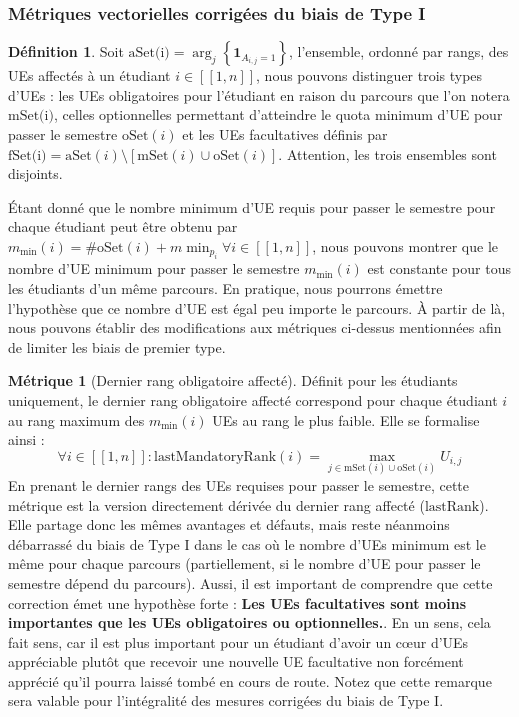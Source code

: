 \documentclass{rapport}
\theoremstyle{definition}
\newtheorem{definition}{Définition}
\theoremstyle{remark}
\theoremstyle{definition}
\newtheorem*{metric}{Métrique}
\theoremstyle{remark}
\newcommand{\llbracket}{[\![}
\newcommand{\rrbracket}{]\!]}
\begin{document}
\subsubsection{Métriques vectorielles corrigées du biais de Type I}

\begin{definition}
    Soit $\text{aSet(i)}=\arg_j\left\{\mathbf{1}_{A_{i,j}=1}\right\}$, l'ensemble, ordonné par rangs, des UEs affectés à un étudiant $i\in \llbracket 1,n\rrbracket$, nous pouvons distinguer trois types d'UEs :
    les UEs obligatoires pour l'étudiant en raison du parcours que l'on notera $\text{mSet(i)}$,
    celles optionnelles permettant d'atteindre le quota minimum d'UE pour passer le semestre $\text{oSet}(i)$
    et les UEs facultatives définis par $\text{fSet(i)} = \text{aSet}(i)\setminus[\text{mSet}(i)\cup\text{oSet}(i)]$.
    Attention, les trois ensembles sont disjoints.
\end{definition}
Étant donné que le nombre minimum d'UE requis pour passer le semestre pour chaque étudiant peut être obtenu par $m_{\min}(i)=\#\text{oSet}(i)+m\!\min_{p_i} \forall i \in \llbracket 1,n \rrbracket$,
nous pouvons montrer que le nombre d'UE minimum pour passer le semestre $m_{\min}(i)$ est constante pour tous les étudiants d'un même parcours. En pratique, nous pourrons émettre l'hypothèse que ce nombre d'UE
est égal peu importe le parcours. À partir de là, nous pouvons établir des modifications aux métriques ci-dessus mentionnées afin de limiter les biais de premier type.

\begin{metric}[Dernier rang obligatoire affecté]
    Définit pour les étudiants uniquement, le dernier rang obligatoire affecté correspond pour chaque étudiant $i$ au rang maximum des $m_{\min}(i)$ UEs au rang le plus faible.
    Elle se formalise ainsi :
    $$
        \forall i\in\llbracket 1, n\rrbracket : \text{lastMandatoryRank}(i) = \max_{j\in \text{mSet}(i)\cup\text{oSet}(i)} U_{i,j}
    $$
    En prenant le dernier rangs des UEs requises pour passer le semestre, cette métrique est la version directement dérivée du dernier rang affecté ($\text{lastRank}$).
    Elle partage donc les mêmes avantages et défauts, mais reste néanmoins débarrassé du biais de Type I dans le cas où le nombre d'UEs minimum est le même pour chaque parcours (partiellement, si le nombre d'UE pour passer le semestre dépend du parcours).
    Aussi, il est important de comprendre que cette correction émet une hypothèse forte : \og\textbf{Les UEs facultatives sont moins importantes que les UEs obligatoires ou optionnelles.}\fg.
    En un sens, cela fait sens, car il est plus important pour un étudiant d'avoir un cœur d'UEs appréciable plutôt que recevoir une nouvelle UE facultative non forcément apprécié qu'il pourra laissé tombé en cours de route.
    Notez que cette remarque sera valable pour l'intégralité des mesures corrigées du biais de Type I.
\end{metric}
\end{document}
